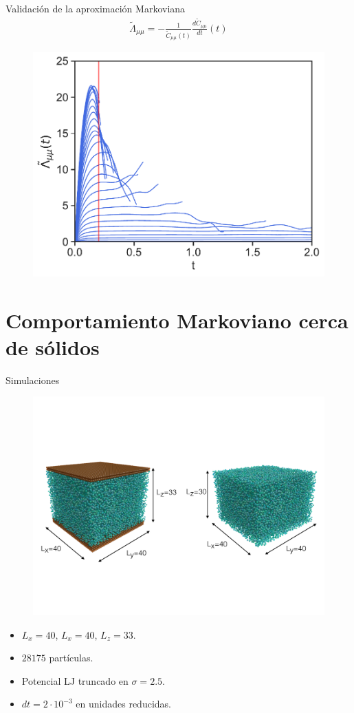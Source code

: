 \documentclass{beamer}
\begin{document}
\begin{frame}{Validación de la aproximación Markoviana}
\begin{align}
  \tilde{\Lambda}_{\mu\mu}=-\frac{1}{\tilde{C}_{\mu\mu}(t)}\frac{d\tilde{C}_{\mu\mu}}{dt}(t)
  \nonumber
\end{align}
\begin{figure}[h!]
\includegraphics[width=0.7\linewidth]{LambdatFourier-PBC-defense}
\end{figure}
\end{frame}

\section{Comportamiento Markoviano cerca de sólidos}

\begin{frame}{Simulaciones}
\begin{figure}
    \centering
    \includegraphics[width=0.8\linewidth]{dim-sim-pbc-walls}
\end{figure}
    \begin{itemize}
      \item $L_x=40$, $L_x=40$, $L_z=33$.
     \item $28175$ partículas. 
     \item Potencial LJ truncado en $\sigma=2.5$.
     \item $dt=2\cdot 10^{-3}$ en unidades reducidas. 
    \end{itemize}
\end{frame}
\end{document}
